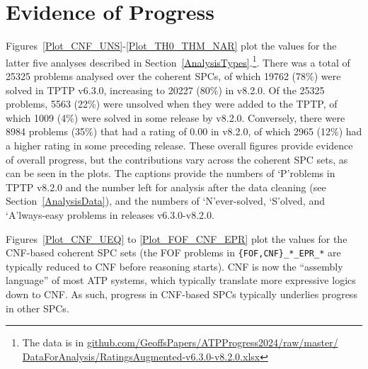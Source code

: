 \documentclass[runningheads]{llncs}
\begin{document}
\section{Evidence of Progress}
\label{Evidence}

Figures~\ref{Plot_CNF_UNS}-\ref{Plot_TH0_THM_NAR} plot the values for the latter five analyses
described in Section~\ref{AnalysisTypes}.\footnote{%
The data is in \href{https://github.com/GeoffsPapers/ATPProgress2024/raw/master/DataForAnalysis/RatingsNoMissing-v6.3.0-v8.2.0.xlsx}{github.com/GeoffsPapers/ATPProgress2024/raw/master/} 
\href{https://github.com/GeoffsPapers/ATPProgress2024/raw/master/DataForAnalysis/RatingsAugmented-v6.3.0-v8.2.0.xlsx}{DataForAnalysis/RatingsAugmented-v6.3.0-v8.2.0.xlsx}}.
There was a total of 25325 problems analysed over the coherent SPCs, of which 19762 (78\%) were 
solved in TPTP v6.3.0, increasing to 20227 (80\%) in v8.2.0.
Of the 25325 problems, 5563 (22\%) were unsolved when they were added to the TPTP, of which 1009 
(4\%) were solved in some release by v8.2.0. 
Conversely, there were 8984 problems (35\%) that had a rating of 0.00 in v8.2.0, of which 2965 
(12\%) had a higher rating in some preceding release.
These overall figures provide evidence of overall progress, but the contributions vary across
the coherent SPC sets, as can be seen in the plots.
The captions provide the numbers of `P'roblems in TPTP v8.2.0 and the number left for analysis 
after the data cleaning (see Section~\ref{AnalysisData}), and the numbers of `N'ever-solved, 
`S'olved, and `A'lways-easy problems in releases v6.3.0-v8.2.0.

Figures~\ref{Plot_CNF_UEQ} to \ref{Plot_FOF_CNF_EPR} plot the values for the CNF-based coherent 
SPC sets (the FOF problems in {\tt \{FOF,CNF\}\_*\_EPR\_*} are typically reduced to CNF before
reasoning starts).
CNF is now the ``assembly language'' of most ATP systems, which typically translate more
expressive logics down to CNF.
As such, progress in CNF-based SPCs typically underlies progress in other SPCs.
\end{document}
